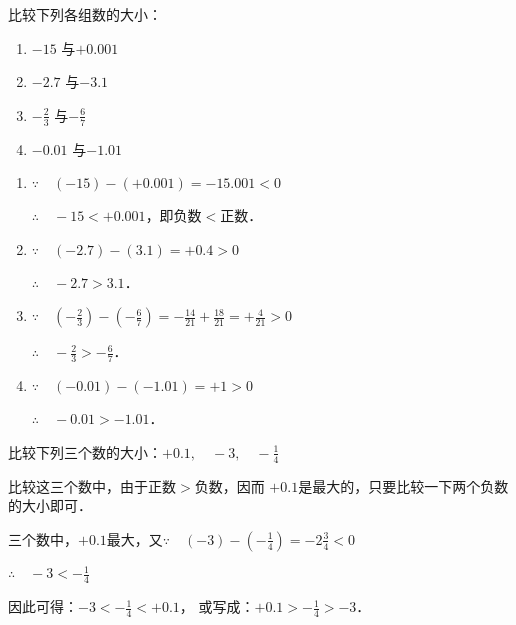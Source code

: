 \begin{example}
	比较下列各组数的大小：
	\begin{multicols}{2}
		\begin{enumerate}
			\item $-15$ 与$+0.001$
			\item $-2.7$ 与$-3.1$
			\item $-\frac{2}{3}$ 与$-\frac{6}{7}$
			\item $-0.01$ 与$-1.01$
		\end{enumerate}
	\end{multicols}
\end{example}

\begin{solution}
	\begin{enumerate}
		\item $\because\quad (-15)-(+0.001)=-15.001<0$
		
		$\therefore\quad -15<+0.001$，即负数$<$正数．
		
		\item $\because\quad (-2.7)-(3.1)=+0.4>0$
		
		$\therefore\quad -2.7>3.1$．
		
		\item $\because\quad \left(-\frac{2}{3}\right)-\left(-\frac{6}{7}\right)=-\frac{14}{21}+\frac{18}{21}=+\frac{4}{21}>0$
		
		$\therefore\quad -\frac{2}{3}>-\frac{6}{7}$．
		
		\item $\because\quad (-0.01)-(-1.01)=+1>0$
		
		$\therefore\quad -0.01>-1.01$．
	\end{enumerate}    
\end{solution}

\begin{example}
	比较下列三个数的大小：$+0.1,\quad -3,\quad -\frac{1}{4}$
\end{example}

\begin{analyze}
	比较这三个数中，由于正数$>$负数，因而
	$+0.1$是最大的，只要比较一下两个负数的大小即可．
\end{analyze}

\begin{solution}
	三个数中，$+0.1$最大，又$\because\quad (-3)-\left(-\frac{1}{4}\right)=-2\frac{3}{4}<0$
	
	$\therefore\quad -3<-\frac{1}{4}$
	
	因此可得：$-3<-\frac{1}{4}<+0.1$，
	或写成：$+0.1>-\frac{1}{4}>-3$．
\end{solution}

